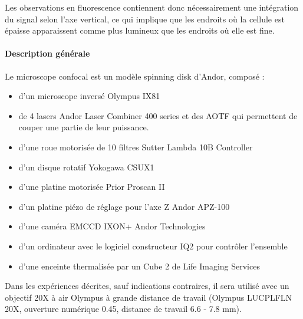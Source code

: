 	Les observations en fluorescence contiennent donc nécessairement une intégration du signal selon l'axe vertical, ce qui implique que les endroits où la cellule est épaisse apparaissent comme plus lumineux que les endroits où elle est fine. 
	
%	
	
	\paragraph{Description générale}
	
	Le microscope confocal est un modèle \og spinning  disk \fg d'Andor, composé : 
	\begin{itemize}
	\item d'un microscope inversé Olympus IX81
	\item de 4 lasers Andor Laser Combiner 400 series et des AOTF qui permettent de couper une partie de leur puissance.
	\item d'une roue motorisée de 10 filtres Sutter Lambda 10B Controller
	\item d'un disque rotatif Yokogawa CSUX1
	\item d'une platine motorisée Prior Proscan II
	\item d'un platine piézo de réglage pour l'axe Z Andor APZ-100
	\item d'une caméra EMCCD IXON+ Andor Technologies
	\item d'un ordinateur avec le logiciel constructeur IQ2 pour contrôler l'ensemble
	\item d'une enceinte thermalisée par un Cube 2 de Life Imaging Services
\end{itemize}	 

Dans les expériences décrites, sauf indications contraires, il sera utilisé avec un objectif 20X à air Olympus à grande distance de travail (Olympus LUCPLFLN 20X, ouverture numérique 0.45, distance de travail 6.6 - 7.8 mm).

